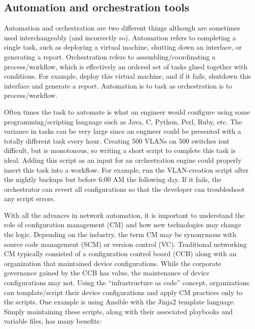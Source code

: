 \subsection{Automation and orchestration tools}
Automation and orchestration are two different things although are sometimes
used interchangeably (and incorrectly so). Automation refers to completing a
single task, such as deploying a virtual machine, shutting down an interface,
or generating a report. Orchestration refers to assembling/coordinating a
process/workflow, which is effectively an ordered set of tasks glued together
with conditions. For example, deploy this virtual machine, and if it fails,
shutdown this interface and generate a report. Automation is to task as
orchestration is to process/workflow.

Often times the task to automate is what an engineer would configure using
some programming/scripting language such as Java, C, Python, Perl, Ruby, etc.
The variance in tasks can be very large since an engineer could be presented
with a totally different task every hour. Creating 500 VLANs on 500 switches
isnt difficult, but is monotonous, so writing a short script to complete this
task is ideal. Adding this script as an input for an orchestration engine
could properly insert this task into a workflow. For example, run the
VLAN-creation script after the nightly backups but before 6:00 AM the
following day. If it fails, the orchestrator can revert all configurations so
that the developer can troubleshoot any script errors.

With all the advances in network automation, it is important to understand the
role of configuration management (CM) and how new technologies may change the
logic. Depending on the industry, the term CM may be synonymous with source
code management (SCM) or version control (VC). Traditional networking CM
typically consisted of a configuration control board (CCB) along with an
organization that maintained device configurations. While the corporate
governance gained by the CCB has value, the maintenance of device
configurations may not. Using the ``infrastructure as code'' concept,
organizations can template/script their device configurations and apply CM
practices only to the scripts. One example is using Ansible with the Jinja2
template language. Simply maintaining these scripts, along with their
associated playbooks and variable files, has many benefits:

